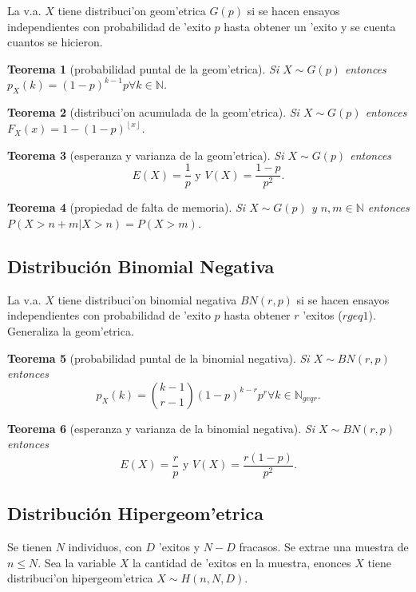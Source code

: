 \documentclass[a4paper,spanish]{article}
\newcommand{\N}[0]{\mathbb{N}}
\newcommand{\piso}[1]{\left\lfloor{x}\right\rfloor}
\newtheorem{teo}{Teorema}
\begin{document}
La v.a. $X$ tiene distribuci'on geom'etrica $G(p)$ si se hacen ensayos
independientes con probabilidad de 'exito $p$ hasta obtener un 'exito
y se cuenta cuantos se hicieron.

\begin{teo}[probabilidad puntal de la geom'etrica]
Si $X \sim G(p)$ entonces $p_X(k) = (1-p)^{k-1}p \forall k \in \N$.
\end{teo}

\begin{teo}[distribuci'on acumulada de la geom'etrica]
Si $X \sim G(p)$ entonces $F_X(x) = 1-(1-p)^{\piso{x}}$.
\end{teo}

\begin{teo}[esperanza y varianza de la geom'etrica]
Si $X \sim G(p)$ entonces
$$E(X) = \frac{1}{p} \mbox{\ \ y\ \ } V(X)=\frac{1-p}{p^2}.$$
\end{teo}

\begin{teo}[propiedad de falta de memoria]
Si $X \sim G(p)$ y $n,m \in \N$ entonces $P(X > n+m |X > n) = P(X > m)$.
\end{teo}

\subsection{Distribuci\'on Binomial Negativa}

La v.a. $X$ tiene distribuci'on binomial negativa $BN(r,p)$ si se
hacen ensayos independientes con probabilidad de 'exito $p$ hasta
obtener $r$ 'exitos ($r geq 1$). Generaliza la geom'etrica.

\begin{teo}[probabilidad puntal de la binomial negativa]
Si $X \sim BN(r,p)$ entonces
$$p_X(k) = {k-1 \choose r-1} (1-p)^{k-r}p^r \forall k \in
\N_{geq r}.$$
\end{teo}

\begin{teo}[esperanza y varianza de la binomial negativa]
Si $X \sim BN(r,p)$ entonces
$$E(X) = \frac{r}{p} \mbox{\ \ y\ \ } V(X)=\frac{r(1-p)}{p^2}.$$
\end{teo}

\subsection{Distribuci\'on Hipergeom'etrica}

Se tienen $N$ individuos, con $D$ 'exitos y $N-D$ fracasos. Se extrae una
muestra de $n \leq N$. Sea la variable $X$ la cantidad de 'exitos en la
muestra, enonces $X$ tiene distribuci'on hipergeom'etrica $X \sim H(n,N,D)$.
\end{document}
